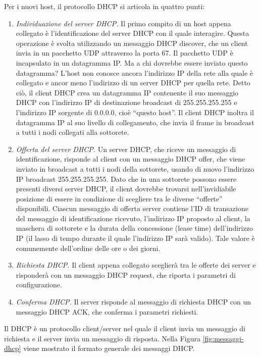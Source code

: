 Per i nuovi host, il protocollo DHCP si articola in quattro punti:
\begin{enumerate}
    \item \textit{Individuazione del server DHCP.} Il primo compito di un host appena collegato è l'identificazione del server DHCP con il quale interagire. Questa operazione è svolta utilizzando un messaggio DHCP discover, che un client invia in un pacchetto UDP attraverso la porta 67. Il pacchetto UDP è incapsulato in un datagramma IP. Ma a chi dovrebbe essere inviato questo datagramma? L'host non conosce ancora l'indirizzo IP della rete alla quale è collegato e ancor meno l'indirizzo di un server DHCP per quella rete. Detto ciò, il client DHCP crea un datagramma IP contenente il suo messaggio DHCP con l'indirizzo IP di destinazione broadcast di 255.255.255.255 e l'indirizzo IP sorgente di 0.0.0.0, cioè “questo host”. Il client DHCP inoltra il datagramma IP al suo livello di collegamento, che invia il frame in broadcast a tutti i nodi collegati alla sottorete.
    \item \textit{Offerta del server DHCP.} Un server DHCP, che riceve un messaggio di identificazione, risponde al client con un messaggio DHCP offer, che viene inviato in broadcast a tutti i nodi della sottorete, usando di nuovo l'indirizzo IP broadcast 255.255.255.255. Dato che in una sottorete possono essere presenti diversi server DHCP, il client dovrebbe trovarsi nell'invidiabile posizione di essere in condizione di scegliere tra le diverse “offerte” disponibili. Ciascun messaggio di offerta server contiene l'ID di transazione del messaggio di identificazione ricevuto, l'indirizzo IP proposto al client, la maschera di sottorete e la durata della concessione (lease time) dell'indirizzo IP (il lasso di tempo durante il quale l'indirizzo IP sarà valido). Tale valore è comunemente dell'ordine delle ore o dei giorni.
    \item \textit{Richiesta DHCP.} Il client appena collegato sceglierà tra le offerte dei server e risponderà con un messaggio DHCP request, che riporta i parametri di configurazione.
    \item \textit{Conferma DHCP.} Il server risponde al messaggio di richiesta DHCP con un messaggio DHCP ACK, che conferma i parametri richiesti.
\end{enumerate}

Il DHCP è un protocollo client/server nel quale il client invia un messaggio di richiesta e il server invia un messaggio di risposta. Nella Figura \ref{fig:messaggi-dhcp} viene mostrato il formato generale dei messaggi DHCP.

